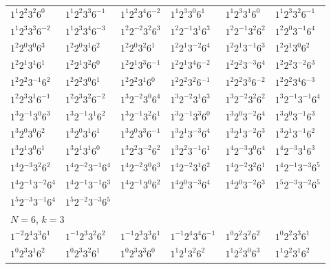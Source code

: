 \documentclass[12pt]{amsart}
\numberwithin{equation}{section}
\theoremstyle{plain}
\theoremstyle{definition}
\theoremstyle{remark}
\begin{document}
\begin{longtable}{llllll}
$1^{1}2^{2}3^{2}6^{0}$ & $1^{1}2^{2}3^{3}6^{-1}$ & $1^{1}2^{2}3^{4}6^{-2}$ & $1^{1}2^{3}3^{0}6^{1}$ & $1^{1}2^{3}3^{1}6^{0}$ & $1^{1}2^{3}3^{2}6^{-1}$\\
$1^{1}2^{3}3^{3}6^{-2}$ & $1^{1}2^{3}3^{4}6^{-3}$ & $1^{2}2^{-2}3^{2}6^{3}$ & $1^{2}2^{-1}3^{1}6^{3}$ & $1^{2}2^{-1}3^{2}6^{2}$ & $1^{2}2^{0}3^{-1}6^{4}$\\
$1^{2}2^{0}3^{0}6^{3}$ & $1^{2}2^{0}3^{1}6^{2}$ & $1^{2}2^{0}3^{2}6^{1}$ & $1^{2}2^{1}3^{-2}6^{4}$ & $1^{2}2^{1}3^{-1}6^{3}$ & $1^{2}2^{1}3^{0}6^{2}$\\
$1^{2}2^{1}3^{1}6^{1}$ & $1^{2}2^{1}3^{2}6^{0}$ & $1^{2}2^{1}3^{3}6^{-1}$ & $1^{2}2^{1}3^{4}6^{-2}$ & $1^{2}2^{2}3^{-3}6^{4}$ & $1^{2}2^{2}3^{-2}6^{3}$\\
$1^{2}2^{2}3^{-1}6^{2}$ & $1^{2}2^{2}3^{0}6^{1}$ & $1^{2}2^{2}3^{1}6^{0}$ & $1^{2}2^{2}3^{2}6^{-1}$ & $1^{2}2^{2}3^{3}6^{-2}$ & $1^{2}2^{2}3^{4}6^{-3}$\\
$1^{2}2^{3}3^{1}6^{-1}$ & $1^{2}2^{3}3^{2}6^{-2}$ & $1^{3}2^{-2}3^{0}6^{4}$ & $1^{3}2^{-2}3^{1}6^{3}$ & $1^{3}2^{-2}3^{2}6^{2}$ & $1^{3}2^{-1}3^{-1}6^{4}$\\
$1^{3}2^{-1}3^{0}6^{3}$ & $1^{3}2^{-1}3^{1}6^{2}$ & $1^{3}2^{-1}3^{2}6^{1}$ & $1^{3}2^{-1}3^{3}6^{0}$ & $1^{3}2^{0}3^{-2}6^{4}$ & $1^{3}2^{0}3^{-1}6^{3}$\\
$1^{3}2^{0}3^{0}6^{2}$ & $1^{3}2^{0}3^{1}6^{1}$ & $1^{3}2^{0}3^{3}6^{-1}$ & $1^{3}2^{1}3^{-3}6^{4}$ & $1^{3}2^{1}3^{-2}6^{3}$ & $1^{3}2^{1}3^{-1}6^{2}$\\
$1^{3}2^{1}3^{0}6^{1}$ & $1^{3}2^{1}3^{1}6^{0}$ & $1^{3}2^{2}3^{-2}6^{2}$ & $1^{3}2^{2}3^{-1}6^{1}$ & $1^{4}2^{-3}3^{0}6^{4}$ & $1^{4}2^{-3}3^{1}6^{3}$\\
$1^{4}2^{-3}3^{2}6^{2}$ & $1^{4}2^{-2}3^{-1}6^{4}$ & $1^{4}2^{-2}3^{0}6^{3}$ & $1^{4}2^{-2}3^{1}6^{2}$ & $1^{4}2^{-2}3^{2}6^{1}$ & $1^{4}2^{-1}3^{-3}6^{5}$\\
$1^{4}2^{-1}3^{-2}6^{4}$ & $1^{4}2^{-1}3^{-1}6^{3}$ & $1^{4}2^{-1}3^{0}6^{2}$ & $1^{4}2^{0}3^{-3}6^{4}$ & $1^{4}2^{0}3^{-2}6^{3}$ & $1^{5}2^{-3}3^{-2}6^{5}$\\
$1^{5}2^{-3}3^{-1}6^{4}$ & $1^{5}2^{-2}3^{-3}6^{5}$ & &&&\\
\midrule
\multicolumn{6}{l}{$N=6$, $k=3$}\\
$1^{-2}2^{4}3^{3}6^{1}$ & $1^{-1}2^{3}3^{2}6^{2}$ & $1^{-1}2^{3}3^{3}6^{1}$ & $1^{-1}2^{4}3^{4}6^{-1}$ & $1^{0}2^{2}3^{2}6^{2}$ & $1^{0}2^{2}3^{3}6^{1}$\\
$1^{0}2^{3}3^{1}6^{2}$ & $1^{0}2^{3}3^{2}6^{1}$ & $1^{0}2^{3}3^{3}6^{0}$ & $1^{1}2^{1}3^{2}6^{2}$ & $1^{1}2^{2}3^{0}6^{3}$ & $1^{1}2^{2}3^{1}6^{2}$\\

\end{longtable}
\end{document}
